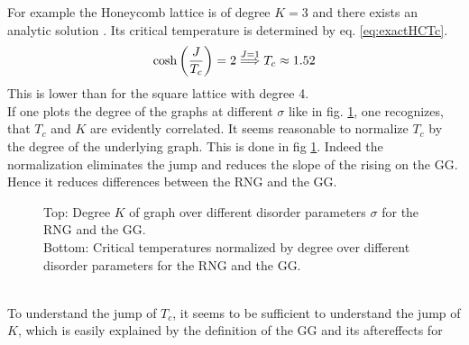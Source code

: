     For example the Honeycomb lattice is of degree \(K=3\)
    and there exists an analytic solution \cite{Wannier1945}.
    Its critical temperature is determined by eq. \eqref{eq:exactHCTc}.
    \begin{equation}
        \cosh\left(\frac{J}{T_c}\right)=2 \overset{J=1}{\Longrightarrow} T_c \approx 1.52
        \label{eq:exactHCTc}
    \end{equation}
    This is lower than for the square lattice with degree 4.\\
    If one plots the degree of the graphs at different \(\sigma\) like
    in fig. \ref{fig:Tc_deg},
    one recognizes, that \(T_c\) and \(K\) are evidently correlated.
    It seems reasonable to normalize \(T_c\) by the degree of the underlying
    graph. This is done in fig \ref{fig:Tc_deg}.
    Indeed the normalization eliminates the jump and reduces the
    slope of the rising on the GG. Hence it reduces differences
    between the RNG and the GG.
    \begin{figure}[htbp]
        \centering


        \caption[Critical Temperature Normalized by Degree of the Graph]
        {
            Top: Degree \(K\) of graph over different
            disorder parameters \(\sigma\) for
             the RNG and
             the GG.\\
            Bottom: Critical temperatures normalized by degree over different
            disorder parameters for
             the RNG and
             the GG.
        }
        \label{fig:Tc_deg}
    \end{figure}\\
    To understand the jump of \(T_c\), it seems to be sufficient to
    understand the jump of \(K\), which is easily explained
    by the definition of the GG and its aftereffects for
